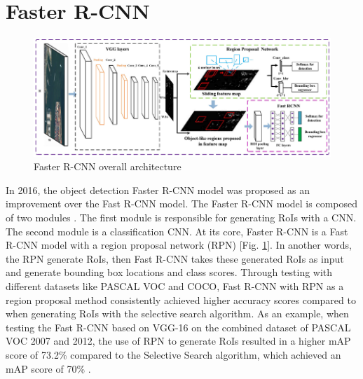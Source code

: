 \section{Faster R-CNN}  \label{sec:faster_rcnn}

\begin{figure}[!ht]
    \centering
    \includegraphics[width=5in]{figures/faster_rcnn_archite.png}
    \caption{Faster R-CNN overall architecture \cite{faster_rcnn_architecture_fig}} \label{fig:faster_rcnn_archite}
\end{figure}

In 2016, the object detection Faster R-CNN model was proposed as an improvement over the Fast R-CNN model. The Faster R-CNN model is composed of two modules . The first module is responsible for generating RoIs with a CNN. The second module is a classification CNN. At its core, Faster R-CNN is a Fast R-CNN model with a region proposal network (RPN) [Fig. \ref{fig:faster_rcnn_archite}]. In another words, the RPN generate RoIs, then Fast R-CNN takes these generated RoIs as input and generate bounding box locations and class scores. Through testing with different datasets like PASCAL VOC and COCO, Fast R-CNN with RPN as a region proposal method consistently achieved higher accuracy scores compared to when generating RoIs with the selective search algorithm. As an example, when testing the Fast R-CNN based on VGG-16 on the combined dataset of PASCAL VOC 2007 and 2012, the use of RPN to generate RoIs resulted in a higher mAP score of 73.2\% compared to the Selective Search algorithm, which achieved an mAP score of 70\% \cite{faster_rcnn_2015}.

